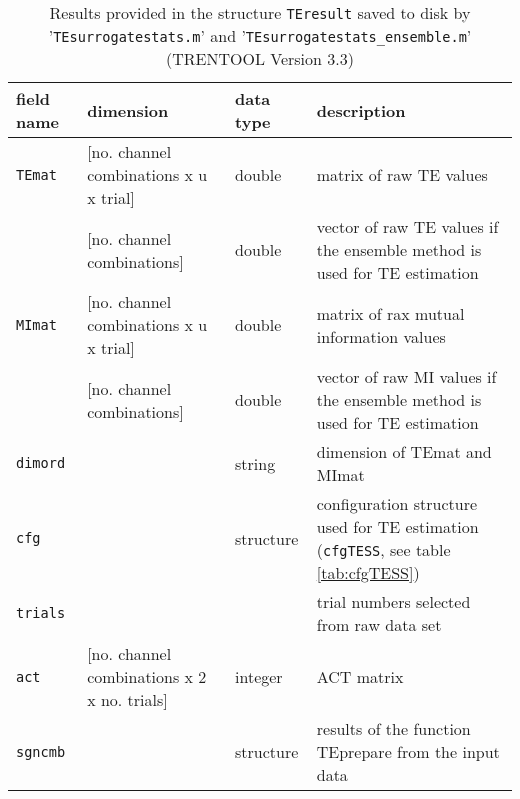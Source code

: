 \begin{table}[H]
\centering
\caption[Results \texttt{TEresult}]{Results provided in the structure \texttt{TEresult} saved to disk by '\texttt{TEsurrogatestats.m}' and '\texttt{TEsurrogatestats\_ensemble.m}' (TRENTOOL Version 3.3)}
\begin{tabularx}{\textwidth}{lL{2.5cm}L{2cm}X}\toprule
\textbf{field name} & \textbf{dimension} & \textbf{data type} & \textbf{description} \\ \midrule
\texttt{TEmat} & [no. channel combinations x u x trial] & double & matrix of raw TE values \\ 
	       & [no. channel combinations] & double & vector of raw TE values if the ensemble method is used for TE estimation\\ 
\texttt{MImat} & [no. channel combinations x u x trial] & double & matrix of rax mutual information values\\
	       & [no. channel combinations] & double & vector of raw MI values if the ensemble method is used for TE estimation\\ 
\texttt{dimord} & & string &  dimension of TEmat and MImat\\
\texttt{cfg} &  & structure & configuration structure used for TE estimation (\texttt{cfgTESS}, see table \ref{tab:cfgTESS}) \\
\texttt{trials} & & & trial numbers selected from raw data set \\
\texttt{act} & [no. channel combinations x 2 x no. trials] & integer & ACT matrix\\
\texttt{sgncmb} & & structure & results of the function TEprepare from the input data \\ 
 \bottomrule
\end{tabularx} \label{tab:TEresult}
\end{table}
